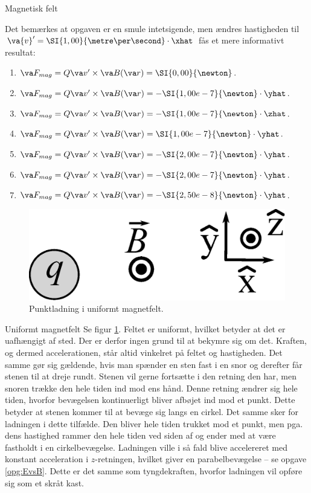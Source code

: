 \begin{opgave}{Magnetisk felt}
\begin{enumerate}
    \end{enumerate}
    Det bemærkes at opgaven er en smule intetsigende, men ændres hastigheden til $\va{v}' = \SI{1,00}{\metre\per\second}\cdot\xhat$ fås et mere informativt resultat:
    \begin{enumerate}
        \item $\va F_{mag} = Q\va v' \times \va B(\va r) = \SI{0,00}{\newton}$.
        \item $\va F_{mag} = Q\va v' \times \va B(\va r) = -\SI{1,00e-7}{\newton}\cdot\yhat$.
        \item $\va F_{mag} = Q\va v' \times \va B(\va r) = -\SI{1,00e-7}{\newton}\cdot \zhat$.
        \item $\va F_{mag} = Q\va v' \times \va B(\va r) = \SI{1,00e-7}{\newton}\cdot \yhat$.
        \item $\va F_{mag} = Q\va v' \times \va B(\va r) = -\SI{2,00e-7}{\newton}\cdot \yhat$.
        \item $\va F_{mag} = Q\va v' \times \va B(\va r) = -\SI{2,00e-7}{\newton}\cdot \yhat$.
        \item $\va F_{mag} = Q\va v' \times \va B(\va r) = -\SI{2,50e-8}{\newton}\cdot \yhat$.
    \end{enumerate}
\end{opgave}

\begin{figure}
    \centering
    \includegraphics[width=.6\columnwidth]{facit/figurer/elektro/uniformt_felt.eps}
    \caption{Punktladning i uniformt magnetfelt.}
    \label{fig:uniformt_b-felt}
\end{figure}
%
\begin{opgave}{Uniformt magnetfelt}
    \opg Se figur \ref{fig:uniformt_b-felt}.
    \opg Feltet er uniformt, hvilket betyder at det er uafhængigt af sted. Der er derfor ingen grund til at bekymre sig om det.
    \opg Kraften, og dermed accelerationen, står altid vinkelret på feltet og hastigheden. Det samme gør sig gældende, hvis man spænder en sten fast i en snor og derefter får stenen til at dreje rundt. Stenen vil gerne fortsætte i den retning den har, men snoren trække den hele tiden ind mod ens hånd. Denne retning ændrer sig hele tiden, hvorfor bevægelsen kontinuerligt bliver afbøjet ind mod et punkt. Dette betyder at stenen kommer til at bevæge sig langs en cirkel. Det samme sker for ladningen i dette tilfælde. Den bliver hele tiden trukket mod et punkt, men pga. dens hastighed rammer den hele tiden ved siden af og ender med at være fastholdt i en cirkelbevægelse.
    \opg Ladningen ville i så fald blive accelereret med konstant acceleration i $z$-retningen, hvilket giver en parabelbevægelse -- se opgave \thechapter\ref{opg:EvsB}. Dette er det samme som tyngdekraften, hvorfor ladningen vil opføre sig som et skråt kast.
\end{opgave}

